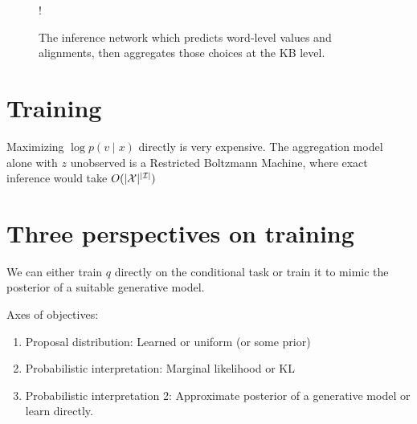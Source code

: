 \documentclass[12pt]{article}
\begin{document}
\begin{figure}[t]
\begin{center}
\resizebox {.3\columnwidth} {!} {
} %
\end{center}
\caption{The inference network which predicts word-level values and alignments,
then aggregates those choices at the KB level.
}
\label{fig:infmodel}
\end{figure}

\section{Training}
Maximizing $\log p(v \mid x)$ directly is very expensive.
The aggregation model alone with $z$ unobserved is a Restricted Boltzmann Machine,
where exact inference would take $O(|\mathcal{X}|^{|\mathcal{I}|})$

\section{Three perspectives on training}
We can either train $q$ directly on the conditional task
or train it to mimic the posterior of a suitable generative model.

Axes of objectives:
\begin{enumerate}
\item Proposal distribution: Learned or uniform (or some prior)
\item Probabilistic interpretation: Marginal likelihood or KL
\item Probabilistic interpretation 2: Approximate posterior
    of a generative model or learn directly.
\end{enumerate}
\end{document}
